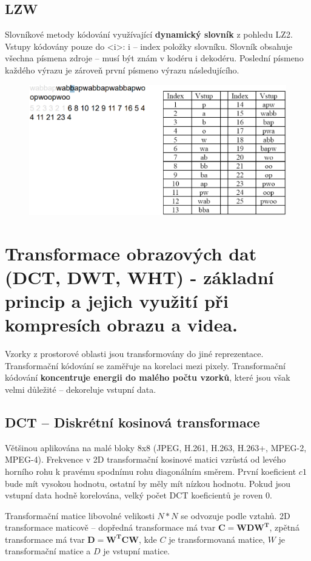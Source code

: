 \subsection{LZW}

Slovníkové metody kódování využívající \textbf{dynamický slovník} z pohledu LZ2. Vstupy kódovány pouze do  <i>: i -- index položky slovníku. Slovník obsahuje všechna
písmena zdroje – musí být znám v kodéru i dekodéru. Poslední písmeno každého výrazu je zároveň první písmeno výrazu následujícího.

\begin{figure}[ht]
    \centering
    \includegraphics[width=0.7\linewidth]{MPC-ZMD//images/LZW.png}
\end{figure}
\FloatBarrier


\section{Transformace obrazových dat (DCT, DWT, WHT) - základní princip a jejich využití při kompresích obrazu a videa.}


Vzorky z prostorové oblasti jsou transformovány do jiné reprezentace. Transformační kódování se zaměřuje na korelaci mezi pixely. Transformační kódování \textbf{koncentruje energii do malého počtu vzorků}, které jsou však velmi důležité -- dekoreluje vstupní data.

\subsection{DCT -- Diskrétní kosinová transformace}

Většinou aplikována na malé bloky 8x8 (JPEG, H.261, H.263, H.263+, MPEG-2, MPEG-4). Frekvence v 2D transformační kosinové matici vzrůstá od levého horního rohu k pravému spodnímu rohu diagonálním směrem. První koeficient $c1$ bude mít vysokou hodnotu, ostatní by měly mít nízkou hodnotu. Pokud jsou vstupní data hodně korelována, velký počet DCT koeficientů je roven 0.

Transformační matice libovolné velikosti $N*N$ se odvozuje podle vztahů. 2D transformace maticově -- dopředná transformace má tvar $\boldsymbol{C=WDW^T}$, zpětná transformace má tvar $\boldsymbol{D=W^TCW}$, kde $C$ je transformovaná matice, $W$ je transformační matice a $D$ je vstupní matice.


